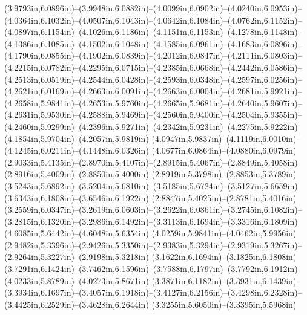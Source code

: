 (3.9793in,6.0896in)--(3.9948in,6.0882in)--(4.0099in,6.0902in)--(4.0240in,6.0953in)--(4.0364in,6.1032in)--(4.0507in,6.1043in)--(4.0642in,6.1084in)--(4.0762in,6.1152in)--(4.0897in,6.1154in)--(4.1026in,6.1186in)--(4.1151in,6.1153in)--(4.1278in,6.1148in)--(4.1386in,6.1085in)--(4.1502in,6.1048in)--(4.1585in,6.0961in)--(4.1683in,6.0896in)--(4.1790in,6.0855in)--(4.1902in,6.0839in)--(4.2012in,6.0847in)--(4.2111in,6.0803in)--(4.2215in,6.0782in)--(4.2295in,6.0715in)--(4.2385in,6.0668in)--(4.2442in,6.0586in)--(4.2513in,6.0519in)--(4.2544in,6.0428in)--(4.2593in,6.0348in)--(4.2597in,6.0256in)--(4.2621in,6.0169in)--(4.2663in,6.0091in)--(4.2663in,6.0004in)--(4.2681in,5.9921in)--(4.2658in,5.9841in)--(4.2653in,5.9760in)--(4.2665in,5.9681in)--(4.2640in,5.9607in)--(4.2631in,5.9530in)--(4.2588in,5.9469in)--(4.2560in,5.9400in)--(4.2504in,5.9355in)--(4.2460in,5.9299in)--(4.2396in,5.9271in)--(4.2342in,5.9231in)--(4.2275in,5.9222in) (4.1854in,5.9704in)--(4.2057in,5.9819in) (4.0947in,5.9837in)--(4.1119in,6.0010in)--(4.1245in,6.0211in)--(4.1448in,6.0326in) (4.0677in,6.0864in)--(4.0880in,6.0979in) (2.9033in,5.4135in)--(2.8970in,5.4107in)--(2.8915in,5.4067in)--(2.8849in,5.4058in) (2.8916in,5.4009in)--(2.8850in,5.4000in) (2.8919in,5.3798in)--(2.8853in,5.3789in) (3.5243in,5.6892in)--(3.5204in,5.6810in)--(3.5185in,5.6724in)--(3.5127in,5.6659in) (3.6343in,6.1808in)--(3.6546in,6.1922in) (2.8847in,5.4025in)--(2.8781in,5.4016in) (3.2559in,6.0347in)--(3.2619in,6.0603in)--(3.2622in,6.0861in)--(3.2745in,6.1082in)--(3.2815in,6.1320in)--(3.2986in,6.1492in)--(3.3113in,6.1694in)--(3.3316in,6.1809in) (4.6085in,5.6442in)--(4.6048in,5.6354in) (4.0259in,5.9841in)--(4.0462in,5.9956in) (2.9482in,5.3396in)--(2.9426in,5.3350in)--(2.9383in,5.3294in)--(2.9319in,5.3267in)--(2.9264in,5.3227in)--(2.9198in,5.3218in) (3.1622in,6.1694in)--(3.1825in,6.1808in) (3.7291in,6.1424in)--(3.7462in,6.1596in)--(3.7588in,6.1797in)--(3.7792in,6.1912in) (4.0233in,5.8789in)--(4.0273in,5.8671in) (3.3871in,6.1182in)--(3.3931in,6.1439in)--(3.3934in,6.1697in)--(3.4057in,6.1918in)--(3.4127in,6.2156in)--(3.4298in,6.2328in)--(3.4425in,6.2529in)--(3.4628in,6.2644in) (3.3255in,5.6050in)--(3.3395in,5.5968in)
